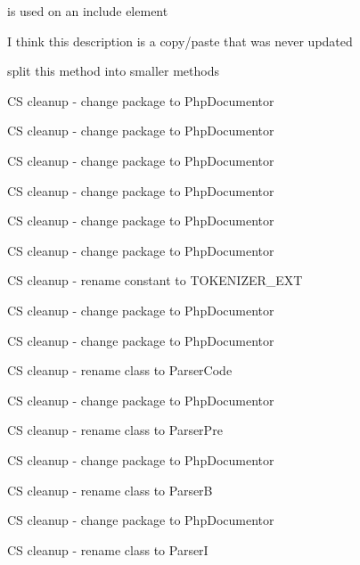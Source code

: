 \begin{DoxyRefList}
\item[\label{todo__todo000083}%
\hypertarget{todo__todo000083}{}%
\-Global \hyperlink{_errors_8inc_a4eb59b8b698e86a795db92874ccbabc7}{\-P\-D\-E\-R\-R\-O\-R\-\_\-\-N\-O\-T\-O\-D\-O\-\_\-\-I\-N\-C\-L\-U\-D\-E} ]is used on an include element  
\item[\label{todo__todo000080}%
\hypertarget{todo__todo000080}{}%
\-Global \hyperlink{_errors_8inc_a8cad5c4b948c81f81e8abfe85a5ea31e}{\-P\-D\-E\-R\-R\-O\-R\-\_\-\-U\-N\-K\-N\-O\-W\-N\-\_\-\-C\-O\-M\-M\-A\-N\-D\-L\-I\-N\-E} ]\-I think this description is a copy/paste that was never updated  
\item[\label{todo__todo000019}%
\hypertarget{todo__todo000019}{}%
\-Global \hyperlink{class_p_h_p_doc___x_m_l___beautifier___renderer___plain_a46b861fe07d8d90a38bd4c7bbc23cda9}{\-P\-H\-P\-Doc\-\_\-\-X\-M\-L\-\_\-\-Beautifier\-\_\-\-Renderer\-\_\-\-Plain} (\$token)]split this method into smaller methods  
\item[\label{todo__todo000003}%
\hypertarget{todo__todo000003}{}%
\-Namespace \hyperlink{namespacephp_documentor}{php\-Documentor} ]\-C\-S cleanup -\/ change package to \-Php\-Documentor 

\-C\-S cleanup -\/ change package to \-Php\-Documentor 

\-C\-S cleanup -\/ change package to \-Php\-Documentor 

\-C\-S cleanup -\/ change package to \-Php\-Documentor 

\-C\-S cleanup -\/ change package to \-Php\-Documentor 

\-C\-S cleanup -\/ change package to \-Php\-Documentor 

\-C\-S cleanup -\/ rename constant to \-T\-O\-K\-E\-N\-I\-Z\-E\-R\-\_\-\-E\-X\-T 

\-C\-S cleanup -\/ change package to \-Php\-Documentor 

\-C\-S cleanup -\/ change package to \-Php\-Documentor 

\-C\-S cleanup -\/ rename class to \-Parser\-Code 

\-C\-S cleanup -\/ change package to \-Php\-Documentor 

\-C\-S cleanup -\/ rename class to \-Parser\-Pre 

\-C\-S cleanup -\/ change package to \-Php\-Documentor 

\-C\-S cleanup -\/ rename class to \-Parser\-B 

\-C\-S cleanup -\/ change package to \-Php\-Documentor 

\-C\-S cleanup -\/ rename class to \-Parser\-I 


\end{DoxyRefList}
